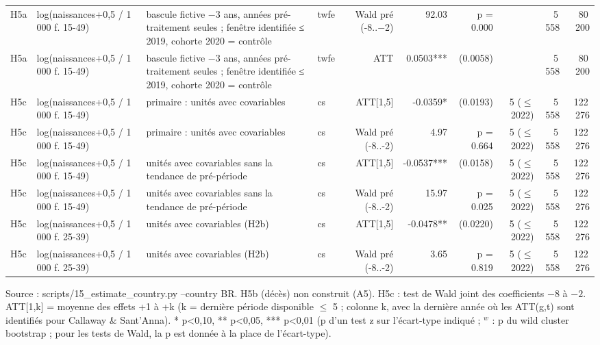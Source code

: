 \begin{table}
\begin{threeparttable}
\begin{tabular}{lp{4.3cm}p{7.0cm}lrrrrrr}
H5a & log(naissances+0,5 / 1 000 f. 15-49) & bascule fictive $-$3 ans, années pré-traitement seules ; fenêtre identifiée ≤ 2019, cohorte 2020 = contrôle & twfe & Wald pré (-8..$-$2) & 92.03 & p = 0.000 &  & 5\,558 & 80\,200 \\
H5a & log(naissances+0,5 / 1 000 f. 15-49) & bascule fictive $-$3 ans, années pré-traitement seules ; fenêtre identifiée ≤ 2019, cohorte 2020 = contrôle & twfe & ATT & 0.0503*** & (0.0058) &  & 5\,558 & 80\,200 \\
H5c & log(naissances+0,5 / 1 000 f. 15-49) & primaire : unités avec covariables & cs & ATT[1,5] & -0.0359* & (0.0193) & 5 ($\leq$ 2022) & 5\,558 & 122\,276 \\
H5c & log(naissances+0,5 / 1 000 f. 15-49) & primaire : unités avec covariables & cs & Wald pré (-8..-2) & 4.97 & p = 0.664 & 5 ($\leq$ 2022) & 5\,558 & 122\,276 \\
H5c & log(naissances+0,5 / 1 000 f. 15-49) & unités avec covariables sans la tendance de pré-période & cs & ATT[1,5] & -0.0537*** & (0.0158) & 5 ($\leq$ 2022) & 5\,558 & 122\,276 \\
H5c & log(naissances+0,5 / 1 000 f. 15-49) & unités avec covariables sans la tendance de pré-période & cs & Wald pré (-8..-2) & 15.97 & p = 0.025 & 5 ($\leq$ 2022) & 5\,558 & 122\,276 \\
H5c & log(naissances+0,5 / 1 000 f. 25-39) & unités avec covariables (H2b) & cs & ATT[1,5] & -0.0478** & (0.0220) & 5 ($\leq$ 2022) & 5\,558 & 122\,276 \\
H5c & log(naissances+0,5 / 1 000 f. 25-39) & unités avec covariables (H2b) & cs & Wald pré (-8..-2) & 3.65 & p = 0.819 & 5 ($\leq$ 2022) & 5\,558 & 122\,276 \\
\bottomrule
\end{tabular}
\begin{tablenotes}\footnotesize
\item Source : scripts/15\_estimate\_country.py --country BR. H5b (décès) non construit (A5). H5c : test de Wald joint des coefficients $-8$ à $-2$. ATT[1,k] = moyenne des effets +1 à +k (k = dernière période disponible $\leq$ 5 ; colonne k, avec la dernière année où les ATT(g,t) sont identifiés pour Callaway \& Sant'Anna). * p<0,10, ** p<0,05, *** p<0,01 (p d'un test z sur l'écart-type indiqué ; $^{w}$ : p du wild cluster bootstrap ; pour les tests de Wald, la p est donnée à la place de l'écart-type).
\end{tablenotes}
\end{threeparttable}
\end{table}
